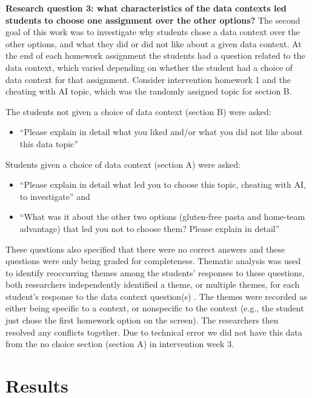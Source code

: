 \documentclass[
  12pt]{article}
\providecommand{\tightlist}{%
  \setlength{\itemsep}{0pt}\setlength{\parskip}{0pt}}\usepackage{longtable,booktabs,array}
\begin{document}
\textbf{Research question 3: what characteristics of the data contexts
led students to choose one assignment over the other options?} The
second goal of this work was to investigate why students chose a data
context over the other options, and what they did or did not like about
a given data context. At the end of each homework assignment the
students had a question related to the data context, which varied
depending on whether the student had a choice of data context for that
assignment. Consider intervention homework 1 and the cheating with AI
topic, which was the randomly assigned topic for section B.

The students not given a choice of data context (section B) were asked:

\begin{itemize}
\tightlist
\item
  ``Please explain in detail what you liked and/or what you did not like
  about this data topic''
\end{itemize}

Students given a choice of data context (section A) were asked:

\begin{itemize}
\tightlist
\item
  ``Please explain in detail what led you to choose this topic, cheating
  with AI, to investigate'' and
\item
  ``What was it about the other two options (gluten-free pasta and
  home-team advantage) that led you not to choose them? Please explain
  in detail''
\end{itemize}

These questions also specified that there were no correct answers and
these questions were only being graded for completeness. Thematic
analysis was used to identify reoccurring themes among the students'
responses to these questions, both researchers independently identified
a theme, or multiple themes, for each student's response to the data
context question(s) \citep{braun2006}. The themes were recorded as
either being specific to a context, or nonspecific to the context (e.g.,
the student just chose the first homework option on the screen). The
researchers then resolved any conflicts together. Due to technical error
we did not have this data from the no choice section (section A) in
intervention week 3.

\section{Results}\label{results}
\end{document}

